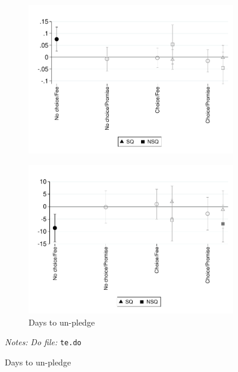 \documentclass[11pt]{article}
\begin{document}
\begin{figure}[H]
\begin{center}
\begin{subfigure}{0.4\textwidth}
        \centering
        \includegraphics[width=\textwidth]{Figuras/te_graph_sum_porcp_c.pdf}
    \end{subfigure}
      \begin{subfigure}{0.4\textwidth}
      \caption{Days to un-pledge}
        \centering
        \includegraphics[width=\textwidth]{Figuras/te_graph_dias_al_desempenyo.pdf}
    \end{subfigure}
    \end{center}
     \footnotesize \textit{Notes: } 
      \footnotesize{ \textit{Do file: }  \texttt{te.do}}
\end{figure}
\end{document}
